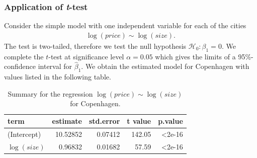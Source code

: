 \subsubsection{Application of \textit{t}-test}  \label{ex:ttest}
Consider the simple model with one independent variable for each of the cities 
\begin{align*}
    \log(price) \sim \log(size).
\end{align*}
The test is two-tailed, therefore we test the null hypothesis $\mathcal{H}_0:\beta_1=0.$
We complete the $t$-test at significance level $\alpha=0.05$ which gives the limits of a 95\%-confidence interval for $\hat{\beta}_1$.
We obtain the estimated model for Copenhagen with values listed in the following table.

\begin{table}[H]
\centering
\begin{tabular}{lrrrr}
\toprule
\textbf{term} & \textbf{estimate} & \textbf{std.error} & \textbf{t value} & \textbf{p.value}\\
\midrule
(Intercept) & 10.52852 & 0.07412 & 142.05 & <2e-16\\
$\log(size)$ & 0.96832 & 0.01682 & 57.59 & <2e-16\\
\bottomrule
\end{tabular}
\caption{Summary for the regression $\log(price) \sim \log(size)$ for Copenhagen.}
\end{table}

